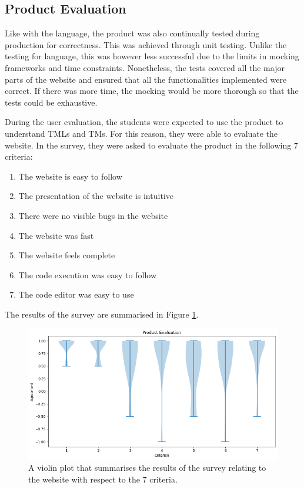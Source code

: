 \subsection{Product Evaluation}
Like with the language, the product was also continually tested during production for correctness. This was achieved through unit testing. Unlike the testing for language, this was however less successful due to the limits in mocking frameworks and time constraints. Nonetheless, the tests covered all the major parts of the website and ensured that all the functionalities implemented were correct. If there was more time, the mocking would be more thorough so that the tests could be exhaustive.


During the user evaluation, the students were expected to use the product to understand TMLs and TMs. For this reason, they were able to evaluate the website. In the survey, they were asked to evaluate the product in the following 7 criteria:
\begin{enumerate}
    \item The website is easy to follow
    \item The presentation of the website is intuitive
    \item There were no visible bugs in the website
    \item The website was fast
    \item The website feels complete
    \item The code execution was easy to follow
    \item The code editor was easy to use
\end{enumerate}
The results of the survey are summarised in Figure \ref{fig:website-evaluation}. 

\begin{figure}[htb]
    \centering
    \includegraphics[scale=0.35]{images/website-evaluation.png}
    \caption{A violin plot that summarises the results of the survey relating to the website with respect to the 7 criteria.}
    \label{fig:website-evaluation}
\end{figure}

